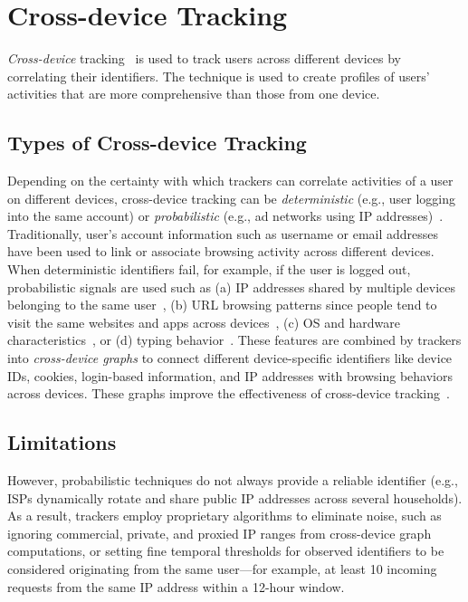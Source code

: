\section{Cross-device Tracking}
\label{sec:cross-device}
\textit{Cross-device} tracking~\cite{brookmanCrossDeviceTrackingMeasurement2017,zimmeckPrivacyAnalysisCrossdevice2017} is used to track users across different devices by correlating their identifiers. The technique is used to create profiles of users’ activities that are more comprehensive than those from one device.

\subsection{Types of Cross-device Tracking}

Depending on the certainty with which trackers can correlate activities of a user on different devices, cross-device tracking can be \textit{deterministic} (e.g., user logging into the same account) or \textit{probabilistic} (e.g., ad networks using IP addresses)~\cite{kimProbabilisticVisitorStitching2017,cottaOffPolicyEvaluationProbabilistic2019}. Traditionally, user’s account information such as username or email addresses have been  used to link or associate browsing activity across different devices. When deterministic identifiers fail, for example, if the user is logged out, probabilistic signals are used such as (a) IP addresses shared by multiple devices belonging to the same user~\cite{diaz-moralesCrossDeviceTrackingMatching2015}, (b) URL browsing patterns since people tend to visit the same websites and apps across devices~\cite{phanCrossDeviceMatching2017}, (c) OS and hardware characteristics~\cite{caoCrossBrowserFingerprintingOS2017}, or (d) typing behavior~\cite{yuanCrossdeviceTrackingIdentification2018}. These features are combined by trackers into \textit{cross-device graphs} to connect different device-specific identifiers like device IDs, cookies, login-based information, and IP addresses with browsing behaviors across devices. These graphs improve the effectiveness of cross-device tracking~\cite{zimmeckPrivacyAnalysisCrossdevice2017,wangGraphTrackGraphbasedCrossDevice2022}.

\subsection{Limitations}

However, probabilistic techniques do not always provide a reliable identifier (e.g., ISPs dynamically rotate and share public IP addresses across several households). As a result, trackers employ proprietary algorithms to eliminate noise, such as ignoring commercial, private, and proxied IP ranges from cross-device graph computations, or setting fine temporal thresholds for observed identifiers to be considered originating from the same user---for example, at least 10 incoming requests from the same IP address within a 12-hour window.

